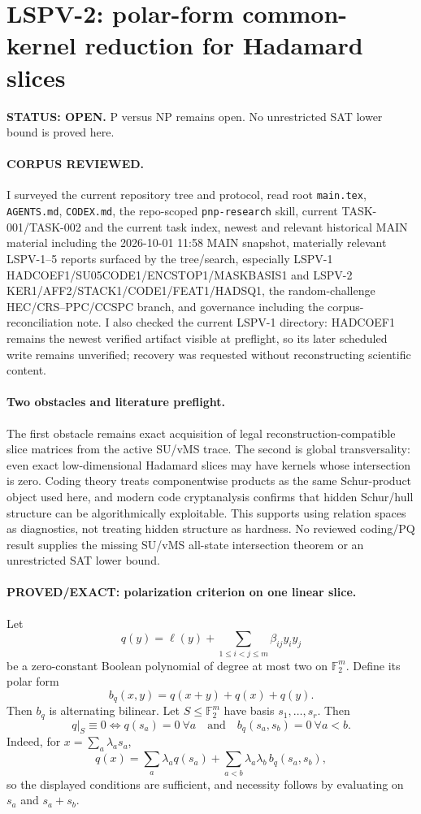 \documentclass[11pt]{article}
\begin{document}
\section*{LSPV-2: polar-form common-kernel reduction for Hadamard slices}
\textbf{STATUS: OPEN.} P versus NP remains open. No unrestricted SAT lower bound is proved here.

\paragraph{CORPUS REVIEWED.}
I surveyed the current repository tree and protocol, read root \texttt{main.tex}, \texttt{AGENTS.md}, \texttt{CODEX.md}, the repo-scoped \texttt{pnp-research} skill, current TASK-001/TASK-002 and the current task index, newest and relevant historical MAIN material including the 2026-10-01 11:58 MAIN snapshot, materially relevant LSPV-1--5 reports surfaced by the tree/search, especially LSPV-1 HADCOEF1/SU05CODE1/ENCSTOP1/MASKBASIS1 and LSPV-2 KER1/AFF2/STACK1/CODE1/FEAT1/HADSQ1, the random-challenge HEC/CRS--PPC/CCSPC branch, and governance including the corpus-reconciliation note. I also checked the current LSPV-1 directory: HADCOEF1 remains the newest verified artifact visible at preflight, so its later scheduled write remains unverified; recovery was requested without reconstructing scientific content.

\paragraph{Two obstacles and literature preflight.}
The first obstacle remains exact acquisition of legal reconstruction-compatible slice matrices from the active SU/vMS trace. The second is global transversality: even exact low-dimensional Hadamard slices may have kernels whose intersection is zero. Coding theory treats componentwise products as the same Schur-product object used here, and modern code cryptanalysis confirms that hidden Schur/hull structure can be algorithmically exploitable. This supports using relation spaces as diagnostics, not treating hidden structure as hardness. No reviewed coding/PQ result supplies the missing SU/vMS all-state intersection theorem or an unrestricted SAT lower bound.

\paragraph{PROVED/EXACT: polarization criterion on one linear slice.}
Let
\[
q(y)=\ell(y)+\sum_{1\le i<j\le m}\beta_{ij}y_i y_j
\]
be a zero-constant Boolean polynomial of degree at most two on \(\mathbb F_2^m\). Define its polar form
\[
b_q(x,y)=q(x+y)+q(x)+q(y).
\]
Then \(b_q\) is alternating bilinear. Let \(S\le\mathbb F_2^m\) have basis \(s_1,\ldots,s_r\). Then
\[
\boxed{
q|_S\equiv0
\iff
q(s_a)=0\ \forall a
\quad\text{and}\quad
b_q(s_a,s_b)=0\ \forall a<b.}
\]
Indeed, for \(x=\sum_a\lambda_a s_a\),
\[
q(x)=\sum_a\lambda_a q(s_a)+
\sum_{a<b}\lambda_a\lambda_b\,b_q(s_a,s_b),
\]
so the displayed conditions are sufficient, and necessity follows by evaluating on \(s_a\) and \(s_a+s_b\).
\end{document}
